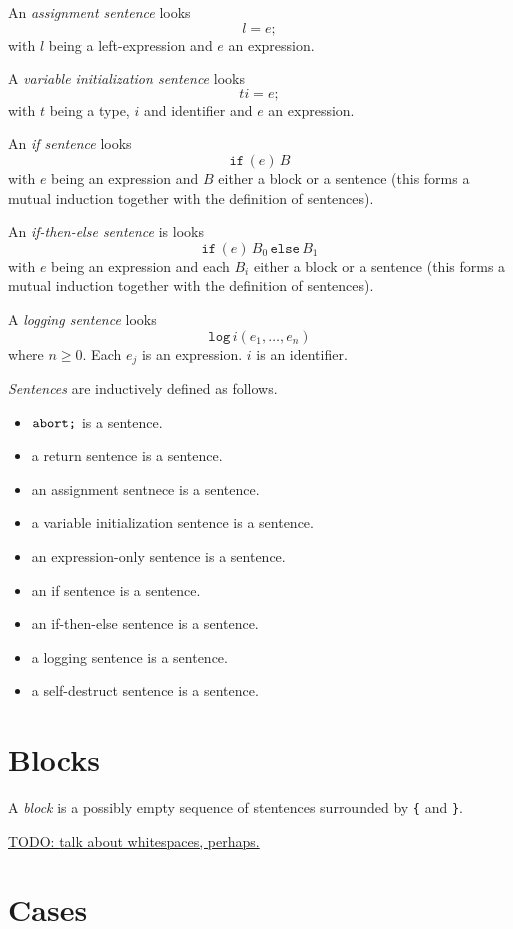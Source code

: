 \documentclass{book}
\newcommand{\todo}[1]{\underline{TODO: {#1}}}
\begin{document}
An \textit{assignment sentence} looks
\[
l = e;
\]
with $l$ being a left-expression and $e$ an expression.

A \textit{variable initialization sentence} looks
\[
t i = e;
\]
with $t$ being a type, $i$ and identifier and $e$ an expression.

An \textit{if sentence} looks
\[
\texttt{if}\, (e)\, B
\]
with $e$ being an expression and $B$ either a block or a sentence (this forms a mutual induction together with the definition of sentences).

An \textit{if-then-else sentence} is looks
\[
\texttt{if}\, (e)\, B_0 \,\texttt{else}\, B_1
\]
with $e$ being an expression and each $B_i$ either a block or a sentence (this forms a mutual induction together with the definition of sentences).

A \textit{logging sentence} looks
\[
\texttt{log}\,i(e_1, \ldots, e_n)
\]
where $n \ge 0$.  Each $e_j$ is an expression.  $i$ is an identifier.

\textit{Sentences} are inductively defined as follows.

\begin{itemize}
\item $\text{\texttt{abort;}}$ is a sentence.
\item a return sentence is a sentence.
\item an assignment sentnece is a sentence.
\item a variable initialization sentence is a sentence.
\item an expression-only sentence is a sentence.
\item an if sentence is a sentence.
\item an if-then-else sentence is a sentence.
\item a logging sentence is a sentence.
\item a self-destruct sentence is a sentence.
\end{itemize}

\section{Blocks}

A \textit{block} is a possibly empty sequence of stentences surrounded by \texttt{\{} and \texttt{\}}.

\todo{talk about whitespaces, perhaps.}

\section{Cases}
\end{document}
